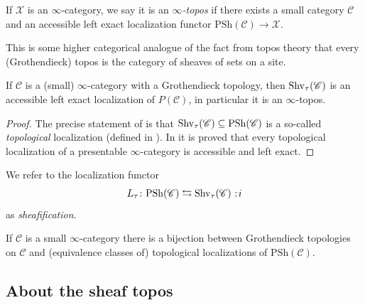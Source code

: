 \documentclass[11pt,openany]{book}
\renewcommand{\Pre}{\mathrm{PSh}}
\begin{document}
\begin{definition} \cite[6.1.0.4]{HTT} If $\mathscr{X}$ is an $\infty$-category, we say it is an $\infty$\textit{-topos} if there exists a small category $\mathscr{C}$ and an accessible left exact localization functor $\Pre(\mathscr{C}) \to \mathscr{X}$.
\end{definition}

This is some higher categorical analogue of the fact from topos theory that every (Grothendieck) topos is the category of sheaves of sets on a site.


\begin{proposition} \cite[6.2.2.7]{HTT} If $\mathscr{C}$ is a (small) $\infty$-category with a Grothendieck topology,  then $\mathrm{Shv}_\tau(\mathscr{C})$ is an accessible left exact localization of $P(\mathscr{C})$, in particular it is an $\infty$-topos.
\end{proposition}
\begin{proof} The precise statement of \cite[6.2.2.7]{HTT} is that $\Shv_\tau(\mathscr{C}) \subseteq \Pre(\mathscr{C})$ is a so-called \textit{topological} localization (defined in \cite[6.2.1.4]{HTT}). In \cite[6.2.1.6]{HTT} it is proved that every topological localization of a presentable $\infty$-category is accessible and left exact.
\end{proof}


\begin{terminology} We refer to the localization functor
\begin{align*}
    L_\tau \colon \Pre(\mathscr{C}) \leftrightarrows \Shv_\tau (\mathscr{C}) \noloc i
\end{align*}
as \textit{sheafification}.
\end{terminology}

\begin{proposition} \cite[6.2.2.17]{HTT} If $\mathscr{C}$ is a small $\infty$-category there is a bijection between Grothendieck topologies on $\mathscr{C}$ and (equivalence classes of) topological localizations of $\Pre(\mathscr{C})$.
\end{proposition}

\subsection{About the sheaf topos}
\end{document}
